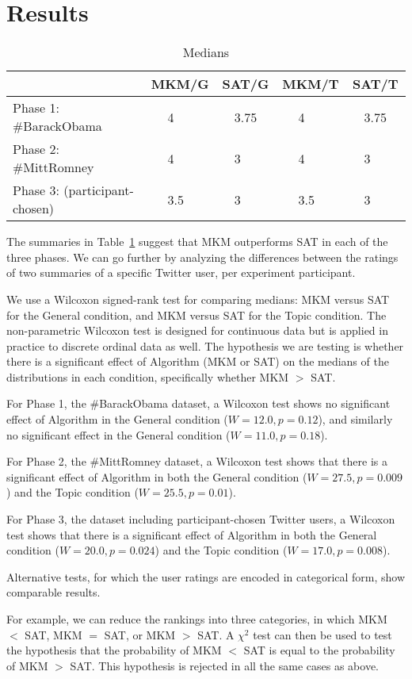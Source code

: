 \section{Results}


\begin{table}
\begin{center}
\begin{tabular}{|l|llllll|llllll|}
\hline
& \multicolumn{3}{c}{MKM\slash G} & \multicolumn{3}{c|}{SAT\slash G} & \multicolumn{3}{|c}{MKM\slash T} & \multicolumn{3}{c|}{SAT\slash T} \\
\hline
Phase 1: \#BarackObama      & & 4    & & & 3.75 & & & 4 & & & 3.75 & \\
Phase 2: \#MittRomney       & & 4    & & & 3    & & & 4 & & & 3  & \\
Phase 3: (participant-chosen) & & 3.5  & & & 3    & & & 3.5 & & & 3  & \\
\hline
\end{tabular}
\end{center}
\caption{Medians}
\label{tab:modes}
\end{table}

The summaries in Table~\ref{tab:modes} suggest that MKM outperforms
SAT in each of the three phases.  We can go further by analyzing
the differences between the ratings of two summaries of a specific
Twitter user, per experiment participant.  

We use a Wilcoxon signed-rank test for comparing medians: MKM versus
SAT for the General condition, and MKM versus SAT for the Topic
condition.  The non-parametric Wilcoxon test is designed for
continuous data but is applied in practice to discrete ordinal data as
well.  The hypothesis we are testing is whether there is a significant
effect of Algorithm (MKM or SAT) on the medians of the distributions
in each condition, specifically whether MKM $>$ SAT.

For Phase 1, the \#BarackObama dataset, a Wilcoxon test shows no
significant effect of Algorithm in the General condition ($W = 12.0, p
= 0.12$), and similarly no significant effect in the General condition
($W = 11.0, p = 0.18$).

For Phase 2, the \#MittRomney dataset, a Wilcoxon test shows that
there is a significant effect of Algorithm in both the General
condition ($W = 27.5, p = 0.009$) and the Topic condition ($W = 25.5,
p = 0.01$).

For Phase 3, the dataset including participant-chosen Twitter users, a
Wilcoxon test shows that there is a significant effect of Algorithm in
both the General condition ($W = 20.0, p = 0.024$) and the Topic
condition ($W = 17.0, p = 0.008$).

Alternative tests, for which the user ratings are encoded in
categorical form, show comparable results.  

For example, we can reduce the rankings into three categories, in
which MKM $<$ SAT, MKM $=$ SAT, or MKM $>$ SAT.  A $\chi^2$ test can
then be used to test the hypothesis that the probability of MKM $<$
SAT is equal to the probability of MKM $>$ SAT.  This hypothesis is
rejected in all the same cases as above.